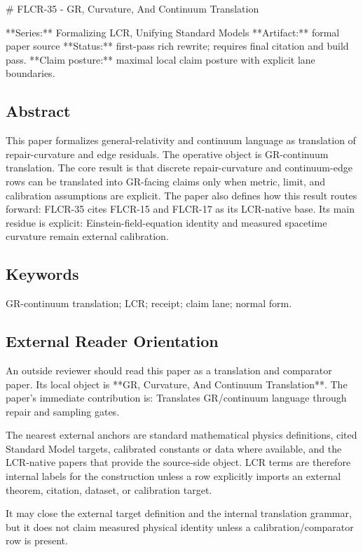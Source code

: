 \documentclass[11pt]{article}
\begin{document}
﻿\# FLCR-35 - GR, Curvature, And Continuum Translation

**Series:** Formalizing LCR, Unifying Standard Models
**Artifact:** formal paper source
**Status:** first-pass rich rewrite; requires final citation and build pass.
**Claim posture:** maximal local claim posture with explicit lane boundaries.

\subsection*{Abstract}

This paper formalizes general-relativity and continuum language as translation of repair-curvature and edge residuals. The operative object is GR-continuum translation. The core result is that discrete repair-curvature and continuum-edge rows can be translated into GR-facing claims only when metric, limit, and calibration assumptions are explicit. The paper also defines how this result routes forward: FLCR-35 cites FLCR-15 and FLCR-17 as its LCR-native base. Its main residue is explicit: Einstein-field-equation identity and measured spacetime curvature remain external calibration.

\subsection*{Keywords}

GR-continuum translation; LCR; receipt; claim lane; normal form.

\subsection*{External Reader Orientation}

An outside reviewer should read this paper as a translation and comparator paper. Its local object is **GR, Curvature, And Continuum Translation**. The paper's immediate contribution is: Translates GR/continuum language through repair and sampling gates.

The nearest external anchors are standard mathematical physics definitions, cited Standard Model targets, calibrated constants or data where available, and the LCR-native papers that provide the source-side object. LCR terms are therefore internal labels for the construction unless a row explicitly imports an external theorem, citation, dataset, or calibration target.

It may close the external target definition and the internal translation grammar, but it does not claim measured physical identity unless a calibration/comparator row is present.
\end{document}
